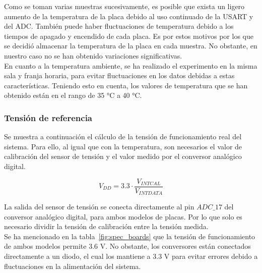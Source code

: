\documentclass[spanish]{template/minim}
\begin{document}
Como se toman varias muestras sucesivamente, es posible que exista un ligero aumento de la temperatura de la placa debido al uso continuado de la USART y del ADC. También puede haber fluctuaciones de temperatura debido a los tiempos de apagado y encendido de cada placa. Es por estos motivos por los que se decidió almacenar la temperatura de la placa en cada muestra. No obstante, en nuestro caso no se han obtenido variaciones significativas.\\

En cuanto a la temperatura ambiente, se ha realizado el experimento en la misma sala y franja horaria, para evitar fluctuaciones en los datos debidas a estas características. Teniendo esto en cuenta, los valores de temperatura que se han obtenido están en el rango de 35 \si{\celsius} a 40 \si{\celsius}.\\

\subsubsection{Tensión de referencia}\label{sec:vdd_reference}

Se muestra a continuación el cálculo de la tensión de funcionamiento real del sistema. Para ello, al igual que con la temperatura, son necesarios el valor de calibración del sensor de tensión y el valor medido por el conversor analógico digital.

\begin{figure}[H]

    \begin{equation*}
        V_{DD} = 3.3 \cdot \frac{V_{INT CAL}}{V_{INT DATA}}
    \end{equation*}

\end{figure}

La salida del sensor de tensión se conecta directamente al pin $ADC\_17$ del conversor analógico digital, para ambos modelos de placas. Por lo que solo es necesario dividir la tensión de calibración entre la tensión medida.\\

Se ha mencionado en la tabla~\ref{fig:spec_boards} que la tensión de funcionamiento de ambos modelos permite 3.6 V. No obstante, los conversores están conectados directamente a un diodo, el cual los mantiene a 3.3 V para evitar errores debido a fluctuaciones en la alimentación del sistema.\\
\end{document}
